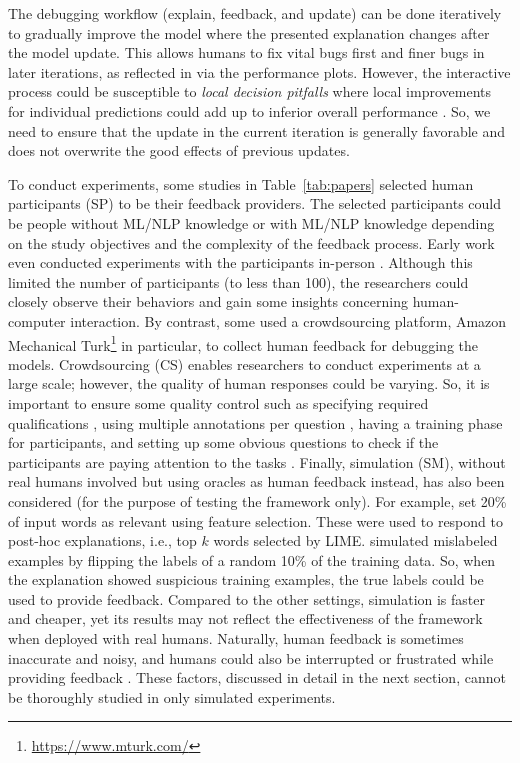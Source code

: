 The debugging workflow (explain, feedback, and update) can be done iteratively to gradually improve the model 
where the presented explanation changes after the model update. 
This allows humans to fix vital bugs first and finer bugs in later iterations, as reflected in  via the performance plots.
However, the interactive process could be susceptible to 
\textit{local decision pitfalls} where local improvements for individual predictions could add up to inferior overall performance .
So, we need to ensure that the update in the current iteration is generally favorable and does not overwrite the good effects of previous updates.

\label{subsec:setting}
To conduct experiments, some studies in Table~\ref{tab:papers} selected human participants (SP) to be their feedback providers.
The selected participants could be people without ML/NLP knowledge  or with ML/NLP knowledge  depending on the study objectives and the complexity of the feedback process.
Early work even conducted experiments with the participants in-person .
Although this limited the number of participants (to less than 100), the researchers could closely observe their behaviors and gain some insights concerning human-computer interaction.
By contrast, some used a crowdsourcing platform, Amazon Mechanical Turk\footnote{\url{https://www.mturk.com/}} in particular, to collect human feedback for debugging the models.
Crowdsourcing (CS) enables researchers to conduct experiments at a large scale; however, the quality of human responses could be varying. So, it is important to ensure some quality control such as specifying required qualifications , using multiple annotations per question , having a training phase for participants, and setting up some obvious questions to check if the participants are paying attention to the tasks
.
Finally,  simulation (SM), without real humans involved but using oracles as human feedback instead, has also been considered (for the purpose of testing the \EBHD framework only). 
For example,  set 20\% of input words as relevant using feature selection.
These were used to respond to 
post-hoc explanations, i.e., top $k$ words selected by LIME.
 simulated mislabeled examples by flipping the labels of a random 10\% of the training data.
So, when the explanation showed suspicious training examples, the true labels could be used to provide feedback.
Compared to the other settings,
simulation is faster and cheaper, yet its results may not reflect the effectiveness of the framework when deployed with real humans. Naturally, human feedback is sometimes inaccurate and noisy, and humans could also be interrupted or frustrated while providing feedback . These factors, discussed in detail in the next section, cannot be thoroughly studied in only simulated experiments.

